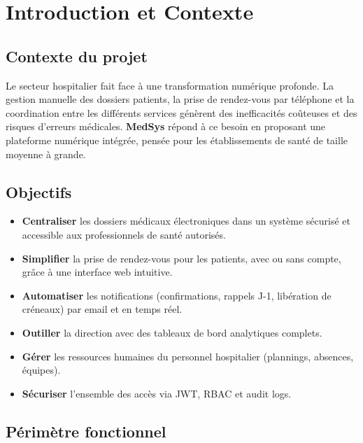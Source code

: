 \chapter{Introduction et Contexte}

\section{Contexte du projet}

Le secteur hospitalier fait face à une transformation numérique profonde. La gestion
manuelle des dossiers patients, la prise de rendez-vous par téléphone et la coordination
entre les différents services génèrent des inefficacités coûteuses et des risques d'erreurs
médicales. \textbf{MedSys} répond à ce besoin en proposant une plateforme numérique
intégrée, pensée pour les établissements de santé de taille moyenne à grande.

\section{Objectifs}

\begin{itemize}[itemsep=4pt]
  \item \textbf{Centraliser} les dossiers médicaux électroniques dans un système sécurisé
    et accessible aux professionnels de santé autorisés.
  \item \textbf{Simplifier} la prise de rendez-vous pour les patients, avec ou sans compte,
    grâce à une interface web intuitive.
  \item \textbf{Automatiser} les notifications (confirmations, rappels J-1, libération
    de créneaux) par email et en temps réel.
  \item \textbf{Outiller} la direction avec des tableaux de bord analytiques complets.
  \item \textbf{Gérer} les ressources humaines du personnel hospitalier (plannings,
    absences, équipes).
  \item \textbf{Sécuriser} l'ensemble des accès via JWT, RBAC et audit logs.
\end{itemize}

\section{Périmètre fonctionnel}

